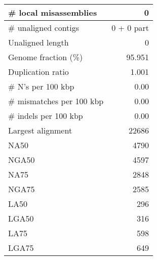 \documentclass[12pt,a4paper]{article}
\begin{document}
\begin{table}[ht]
\begin{center}
\begin{tabular}{|l*{1}{|r}|}
\# local misassemblies & 0 \\ \hline
\# unaligned contigs & 0 + 0 part \\ \hline
Unaligned length & 0 \\ \hline
Genome fraction (\%) & 95.951 \\ \hline
Duplication ratio & 1.001 \\ \hline
\# N's per 100 kbp & 0.00 \\ \hline
\# mismatches per 100 kbp & 0.00 \\ \hline
\# indels per 100 kbp & 0.00 \\ \hline
Largest alignment & 22686 \\ \hline
NA50 & 4790 \\ \hline
NGA50 & 4597 \\ \hline
NA75 & 2848 \\ \hline
NGA75 & 2585 \\ \hline
LA50 & 296 \\ \hline
LGA50 & 316 \\ \hline
LA75 & 598 \\ \hline
LGA75 & 649 \\ \hline
\end{tabular}
\end{center}
\end{table}
\end{document}
